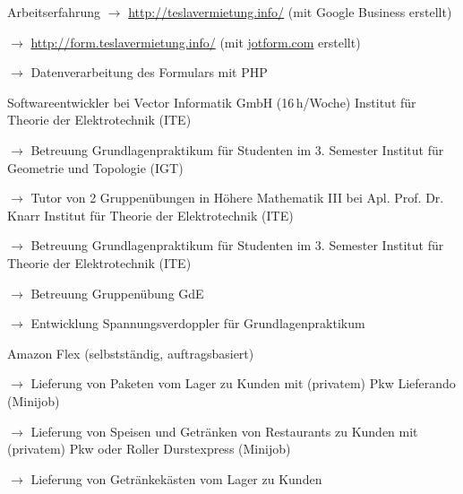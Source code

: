 \begin{rubric}{\textcolor{black!20!blue!100}{Arbeitserfahrung}}
			\setlength{\hangindent}{\widthof{$\rightarrow$ }}
			$\rightarrow$ \url{http://teslavermietung.info/} (mit Google Business erstellt)

			$\rightarrow$ \url{http://form.teslavermietung.info/} (mit \href{https://www.jotform.com/}{jotform.com} erstellt)

			$\rightarrow$ Datenverarbeitung des Formulars mit PHP
			
		\entry*[05/2016 --- 10/2017]
			Softwareentwickler bei Vector Informatik GmbH (16\,h/Woche)
		\entry*[10/2015 --- 03/2016]
			Institut für Theorie der Elektrotechnik (ITE)
				
			\setlength{\hangindent}{\widthof{$\rightarrow$ }}
			$\rightarrow$ Betreuung Grundlagenpraktikum für Studenten im 3. Semester
		\entry*
			Institut für Geometrie und Topologie (IGT)
			
			\setlength{\hangindent}{\widthof{$\rightarrow$ }}
			$\rightarrow$ Tutor von 2 Gruppenübungen in Höhere Mathematik III bei Apl. Prof. Dr. Knarr
		\entry*[10/2014 --- 03/2015]
			Institut für Theorie der Elektrotechnik (ITE)
			
			\setlength{\hangindent}{\widthof{$\rightarrow$ }}
			$\rightarrow$ Betreuung Grundlagenpraktikum für Studenten im 3. Semester
		\entry*[10/2013 --- 03/2014]
			Institut für Theorie der Elektrotechnik (ITE)
			
			\setlength{\hangindent}{\widthof{$\rightarrow$ }}
			$\rightarrow$ Betreuung Gruppenübung GdE
			
			$\rightarrow$ Entwicklung Spannungsverdoppler für Grundlagenpraktikum
	
		\entry*[09/11/2020 --- 06/2022]
			Amazon Flex (selbstständig, auftragsbasiert)
			
			\setlength{\hangindent}{\widthof{$\rightarrow$ }}
			$\rightarrow$ Lieferung von Paketen vom Lager zu Kunden mit (privatem) Pkw
		\entry*[24/10/2020 --- 04/01/2021]
			Lieferando (Minijob)
			
			\setlength{\hangindent}{\widthof{$\rightarrow$ }}
			$\rightarrow$ Lieferung von Speisen und Getränken von Restaurants zu Kunden mit (privatem) Pkw oder Roller
		\entry*[17/07/2020 --- 18/10/2020]
			Durstexpress (Minijob)
			
			\setlength{\hangindent}{\widthof{$\rightarrow$ }}
			$\rightarrow$ Lieferung von Getränkekästen vom Lager zu Kunden
				

\end{rubric}
